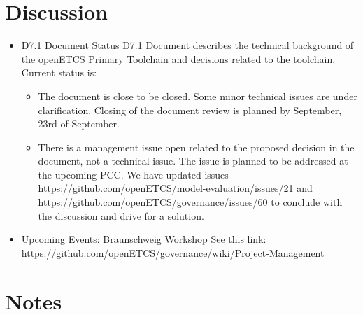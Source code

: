 \documentclass[a4paper, 11pt]{article}
\begin{document}
\section{Discussion}
\begin{itemize}
\item D7.1 Document Status
D7.1 Document describes the technical background of the openETCS Primary Toolchain and decisions related to the toolchain.
Current status is:
\begin{itemize}
\item The document is close to be closed. Some minor technical issues are under clarification. Closing of the document review is planned by September, 23rd of September. 
\item There is a management issue open related to the proposed decision in the document, not a technical issue. The issue is planned to be addressed at the upcoming PCC.
We have updated issues \url{https://github.com/openETCS/model-evaluation/issues/21} and \url {https://github.com/openETCS/governance/issues/60} to conclude with the discussion and drive for a solution.\\ 
\end{itemize}

\item Upcoming Events: Braunschweig Workshop
See this link: \url{https://github.com/openETCS/governance/wiki/Project-Management}

\end{itemize}

\section{Notes}
\end{document}
